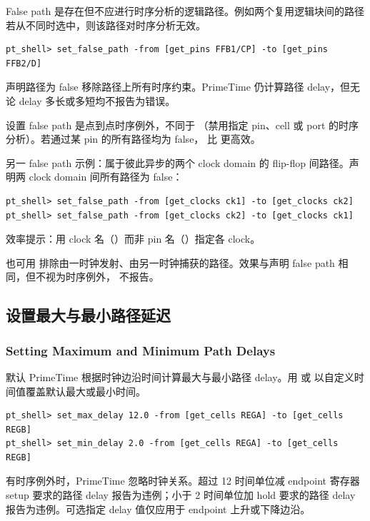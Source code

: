 False path 是存在但不应进行时序分析的逻辑路径。例如两个复用逻辑块间的路径若从不同时选中，则该路径对时序分析无效。

\begin{lstlisting}
pt_shell> set_false_path -from [get_pins FFB1/CP] -to [get_pins FFB2/D]
\end{lstlisting}

声明路径为 false 移除路径上所有时序约束。PrimeTime 仍计算路径 delay，但无论 delay 多长或多短均不报告为错误。

设置 false path 是点到点时序例外，不同于 （禁用指定 pin、cell 或 port 的时序分析）。若通过某 pin 的所有路径均为 false， 比  更高效。

另一 false path 示例：属于彼此异步的两个 clock domain 的 flip-flop 间路径。声明两 clock domain 间所有路径为 false：
\begin{lstlisting}
pt_shell> set_false_path -from [get_clocks ck1] -to [get_clocks ck2]
pt_shell> set_false_path -from [get_clocks ck2] -to [get_clocks ck1]
\end{lstlisting}

效率提示：用 clock 名（）而非 pin 名（）指定各 clock。

也可用  排除由一时钟发射、由另一时钟捕获的路径。效果与声明 false path 相同，但不视为时序例外， 不报告。

\subsection{设置最大与最小路径延迟}
\subsubsection*{Setting Maximum and Minimum Path Delays}

默认 PrimeTime 根据时钟边沿时间计算最大与最小路径 delay。用  或  以自定义时间值覆盖默认最大或最小时间。

\begin{lstlisting}
pt_shell> set_max_delay 12.0 -from [get_cells REGA] -to [get_cells REGB]
pt_shell> set_min_delay 2.0 -from [get_cells REGA] -to [get_cells REGB]
\end{lstlisting}

有时序例外时，PrimeTime 忽略时钟关系。超过 12 时间单位减 endpoint 寄存器 setup 要求的路径 delay 报告为违例；小于 2 时间单位加 hold 要求的路径 delay 报告为违例。可选指定 delay 值仅应用于 endpoint 上升或下降边沿。

